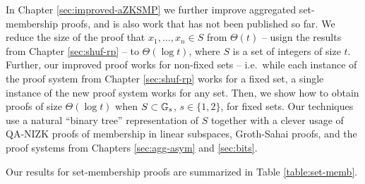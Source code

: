 In Chapter \ref{sec:improved-aZKSMP} we further improve aggregated set-membership proofs, and is also work that has not been published so far. We reduce the size of the proof that $x_1,\ldots,x_n\in S$ from $\Theta(t)$ -- usign the results from Chapter \ref{sec:shuf-rp} -- to $\Theta(\log t)$, where $S$ is a set of integers of size $t$. Further, our improved proof works for non-fixed sets -- i.e.~while each instance of the proof system from Chapter \ref{sec:shuf-rp} works for a fixed set, a single instance of the new proof system works for any set. Then, we show how to obtain proofs of size $\Theta(\log t)$ when $S\subset\mathbb{G}_s$, $s\in\{1,2\}$, for fixed sets. Our techniques use a natural ``binary tree'' representation of $S$ together with a clever usage of QA-NIZK proofs of membership in linear subspaces, Groth-Sahai proofs, and the proof systems from Chapters \ref{sec:agg-asym} and \ref{sec:bits}.
  

Our results for set-membership proofs are summarized in Table \ref{table:set-memb}.


